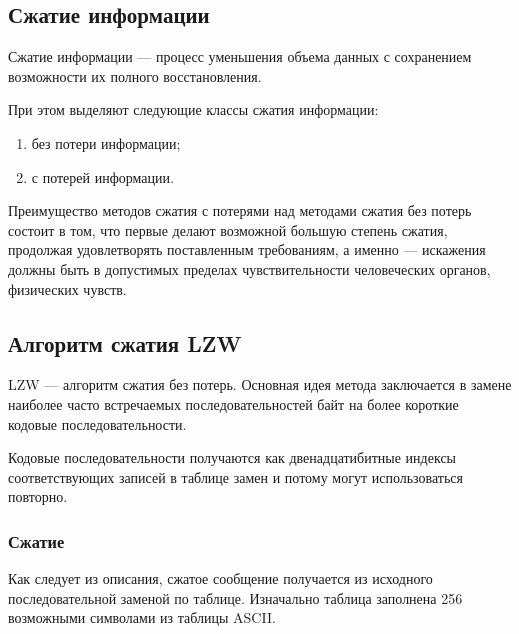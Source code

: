 
\vspace{-1\baselineskip}

%     

\subsection{Сжатие информации}

Сжатие информации --- процесс уменьшения объема данных с сохранением
возможности их полного восстановления.

При этом выделяют следующие классы сжатия информации:
\begin{enumerate}
    \item без потери информации;
    \item с потерей информации.
\end{enumerate}

Преимущество методов сжатия с потерями над методами сжатия без потерь состоит в
том, что первые делают возможной большую степень сжатия, продолжая
удовлетворять поставленным требованиям, а именно --- искажения должны быть в
допустимых пределах чувствительности человеческих органов, физических чувств.

\subsection{Алгоритм сжатия LZW}

LZW --- алгоритм сжатия без потерь. Основная идея метода заключается в замене
наиболее часто встречаемых последовательностей байт на более короткие кодовые
последовательности.

Кодовые последовательности получаются как двенадцатибитные индексы
соответствующих записей в таблице замен и потому могут использоваться повторно.

\subsubsection{Сжатие}

Как следует из описания, сжатое сообщение получается из исходного
последовательной заменой по таблице. Изначально таблица заполнена 256
возможными символами из таблицы ASCII.

